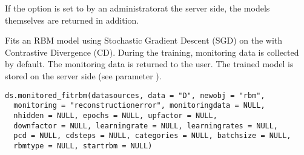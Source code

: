 %
\begin{Details}\relax
If the option  is set to 
by an administratorat the server side, the models themselves are returned in addition.
\end{Details}
%
\begin{Description}\relax
Fits an RBM model using Stochastic Gradient Descent (SGD) on the 
with Contrastive Divergence (CD).
During the training, monitoring data is collected by default.
The monitoring data is returned to the user.
The trained model is stored on the server side (see parameter ).
\end{Description}
%
\begin{Usage}
\begin{verbatim}
ds.monitored_fitrbm(datasources, data = "D", newobj = "rbm",
  monitoring = "reconstructionerror", monitoringdata = NULL,
  nhidden = NULL, epochs = NULL, upfactor = NULL,
  downfactor = NULL, learningrate = NULL, learningrates = NULL,
  pcd = NULL, cdsteps = NULL, categories = NULL, batchsize = NULL,
  rbmtype = NULL, startrbm = NULL)
\end{verbatim}
\end{Usage}
%
